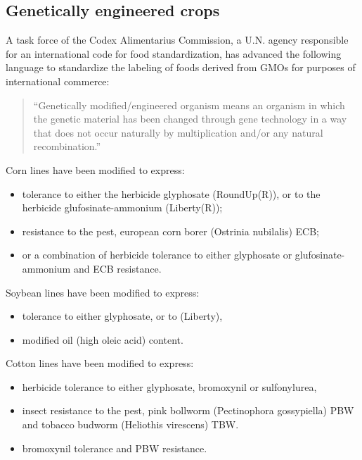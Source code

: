 \documentclass[nofonts,]{tufte-handout}
\providecommand{\tightlist}{%
  \setlength{\itemsep}{0pt}\setlength{\parskip}{0pt}}
\begin{document}
\hypertarget{genetically-engineered-crops}{%
\subsection{Genetically engineered
crops}\label{genetically-engineered-crops}}

A task force of the Codex Alimentarius Commission, a U.N. agency
responsible for an international code for food standardization, has
advanced the following language to standardize the labeling of foods
derived from GMOs for purposes of international commerce:

\begin{quote}
``Genetically modified/engineered organism means an organism in which
the genetic material has been changed through gene technology in a way
that does not occur naturally by multiplication and/or any natural
recombination.''
\end{quote}

Corn lines have been modified to express:

\begin{itemize}
\tightlist
\item
  tolerance to either the herbicide glyphosate (RoundUp(R)), or to the
  herbicide glufosinate-ammonium (Liberty(R));
\item
  resistance to the pest, european corn borer (Ostrinia nubilalis) ECB;
\item
  or a combination of herbicide tolerance to either glyphosate or
  glufosinate-ammonium and ECB resistance.
\end{itemize}

Soybean lines have been modified to express:

\begin{itemize}
\tightlist
\item
  tolerance to either glyphosate, or to (Liberty),
\item
  modified oil (high oleic acid) content.
\end{itemize}

Cotton lines have been modified to express:

\begin{itemize}
\tightlist
\item
  herbicide tolerance to either glyphosate, bromoxynil or sulfonylurea,
\item
  insect resistance to the pest, pink bollworm (Pectinophora
  gossypiella) PBW and tobacco budworm (Heliothis virescens) TBW.
\item
  bromoxynil tolerance and PBW resistance.
\end{itemize}
\end{document}
